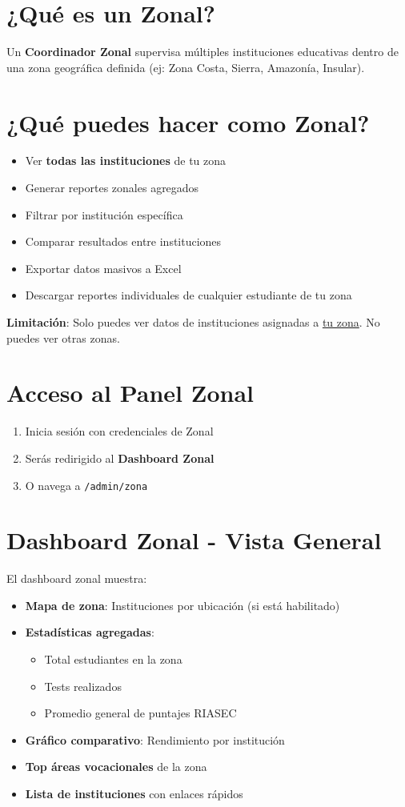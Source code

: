 \documentclass[12pt, a4paper]{report}
\begin{document}
\section{¿Qué es un Zonal?}
Un \textbf{Coordinador Zonal} supervisa múltiples instituciones educativas dentro de una zona geográfica definida (ej: Zona Costa, Sierra, Amazonía, Insular).

\section{¿Qué puedes hacer como Zonal?}
\begin{itemize}
    \item Ver \textbf{todas las instituciones} de tu zona
    \item Generar reportes zonales agregados
    \item Filtrar por institución específica
    \item Comparar resultados entre instituciones
    \item Exportar datos masivos a Excel
    \item Descargar reportes individuales de cualquier estudiante de tu zona
\end{itemize}

\textbf{Limitación}: Solo puedes ver datos de instituciones asignadas a \underline{tu zona}. No puedes ver otras zonas.

\section{Acceso al Panel Zonal}
\begin{enumerate}
    \item Inicia sesión con credenciales de Zonal
    \item Serás redirigido al \textbf{Dashboard Zonal}
    \item O navega a \texttt{/admin/zona}
\end{enumerate}

\section{Dashboard Zonal - Vista General}
El dashboard zonal muestra:
\begin{itemize}
    \item \textbf{Mapa de zona}: Instituciones por ubicación (si está habilitado)
    \item \textbf{Estadísticas agregadas}:
    \begin{itemize}
        \item Total estudiantes en la zona
        \item Tests realizados
        \item Promedio general de puntajes RIASEC
    \end{itemize}
    \item \textbf{Gráfico comparativo}: Rendimiento por institución
    \item \textbf{Top áreas vocacionales} de la zona
    \item \textbf{Lista de instituciones} con enlaces rápidos
\end{itemize}
\end{document}
